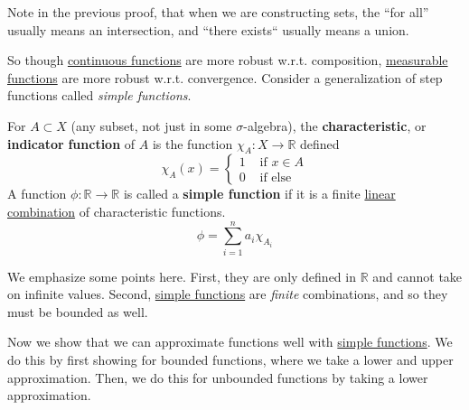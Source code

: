  Note in the previous proof, that when we are constructing sets, the ``for all'' usually means an intersection, and ``there exists`` usually means a union. 

  So though \hyperref[pst-def:continuous_func]{continuous functions} are more robust w.r.t. composition, \hyperref[def:measurable-function]{measurable functions} are more robust w.r.t. convergence. Consider a generalization of step functions called \textit{simple functions}. 

  \begin{definition}
    \label{def:simple-functions}
    For $A \subset X$ (any subset, not just in some $\sigma$-algebra), the \textbf{characteristic}, or \textbf{indicator} \textbf{function} of $A$ is the function $\chi_A : X \to \mathbb{R}$ defined 
    \begin{equation}
      \chi_A (x) = \begin{cases} 1 & \text{ if } x \in A \\ 0 & \text{ if else} \end{cases}
    \end{equation}
    A function $\phi: \mathbb{R} \to \mathbb{R}$ is called a \textbf{simple function} if it is a finite \hyperref[lin-def:linear-combination]{linear combination} of characteristic functions. 
    \begin{equation}
      \phi = \sum_{i=1}^n a_i \chi_{A_i}
    \end{equation}
  \end{definition} 

  We emphasize some points here. First, they are only defined in $\mathbb{R}$ and cannot take on infinite values. Second, \hyperref[def:simple-functions]{simple functions} are \textit{finite} combinations, and so they must be bounded as well. 

  Now we show that we can approximate functions well with \hyperref[def:simple-functions]{simple functions}. We do this by first showing for bounded functions, where we take a lower and upper approximation. Then, we do this for unbounded functions by taking a lower approximation. 

